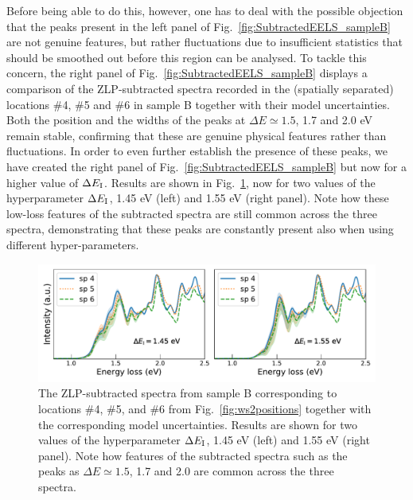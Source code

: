 Before being able to do this, however, one has to deal with the possible objection
that the peaks present in the left panel of Fig.~\ref{fig:SubtractedEELS_sampleB} are not
genuine features, but rather fluctuations due to insufficient statistics
that should be smoothed out before this region can be analysed.
%
To tackle this concern, the right panel of Fig.~\ref{fig:SubtractedEELS_sampleB}
displays a comparison of the ZLP-subtracted spectra recorded in the 
(spatially separated) locations \#4, \#5 and \#6
in sample B together with their model uncertainties.
%
Both the position and the widths of the peaks at $\Delta E\simeq 1.5$,
1.7 and 2.0 eV remain stable, confirming that these
are genuine physical features rather than fluctuations.
%
In order to even further establish the presence of these peaks, 
we have created the right panel of Fig.~\ref{fig:SubtractedEELS_sampleB}
but now for a higher value of $\Delta E_{\rm I}$. 
%
Results are shown in Fig.~\ref{fig:subtracted_spectra_comp}, now for two values of the 
hyperparameter $\Delta E_{\rm I}$, 1.45 eV (left) and 1.55 eV (right panel).
%
Note how these low-loss features of the subtracted spectra 
are still common across the three spectra, demonstrating that these
peaks are constantly present
also when using different hyper-parameters.

\begin{figure}[H]
\begin{centering}
  \includegraphics[width=0.99\linewidth]{plots/subtracted_spectra_comp.pdf}
  \caption{The ZLP-subtracted spectra from sample B corresponding to locations \#4, \#5, and \#6
    from Fig.~\ref{fig:ws2positions} together with the corresponding model uncertainties.
    Results are shown for two values of the hyperparameter $\Delta E_{\rm I}$,
    1.45 eV (left) and 1.55 eV (right panel).
    Note how features of the subtracted spectra such as the peaks as $\Delta E\simeq 1.5$,
    1.7 and 2.0 are common across the three spectra.
  }
\label{fig:subtracted_spectra_comp}
\end{centering}
\end{figure}

